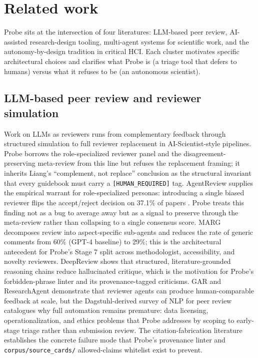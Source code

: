 \section{Related work}
\label{sec:related}

Probe sits at the intersection of four literatures: LLM-based peer review, AI-assisted research-design tooling, multi-agent systems for scientific work, and the autonomy-by-design tradition in critical HCI. Each cluster motivates specific architectural choices and clarifies what Probe is (a triage tool that defers to humans) versus what it refuses to be (an autonomous scientist).

\subsection{LLM-based peer review and reviewer simulation}

Work on LLMs as reviewers runs from complementary feedback \citep{liang2024large} through structured simulation \citep{jin2024agentreview, darcy2024marg, zhu2025deepreview, bougie2025gar} to full reviewer replacement in AI-Scientist-style pipelines. Probe borrows the role-specialized reviewer panel and the disagreement-preserving meta-review from this line but refuses the replacement framing; it inherits Liang's ``complement, not replace'' conclusion as the structural invariant that every guidebook must carry a \texttt{[HUMAN\_REQUIRED]} tag. AgentReview supplies the empirical warrant for role-specialized personas: introducing a single biased reviewer flips the accept/reject decision on 37.1\% of papers \citep{jin2024agentreview}. Probe treats this finding not as a bug to average away but as a signal to preserve through the meta-review rather than collapsing to a single consensus score. MARG \citep{darcy2024marg} decomposes review into aspect-specific sub-agents and reduces the rate of generic comments from 60\% (GPT-4 baseline) to 29\%; this is the architectural antecedent for Probe's Stage 7 split across methodologist, accessibility, and novelty reviewers. DeepReview \citep{zhu2025deepreview} shows that structured, literature-grounded reasoning chains reduce hallucinated critique, which is the motivation for Probe's forbidden-phrase linter and its provenance-tagged criticisms. GAR \citep{bougie2025gar} and ResearchAgent \citep{baek2025researchagent} demonstrate that reviewer agents can produce human-comparable feedback at scale, but the Dagstuhl-derived survey of NLP for peer review \citep{kuznetsov2024nlppeerreview} catalogues why full automation remains premature: data licensing, operationalization, and ethics problems that Probe addresses by scoping to early-stage triage rather than submission review. The citation-fabrication literature establishes the concrete failure mode that Probe's provenance linter and \texttt{corpus/source\_cards/} allowed-claims whitelist exist to prevent.

